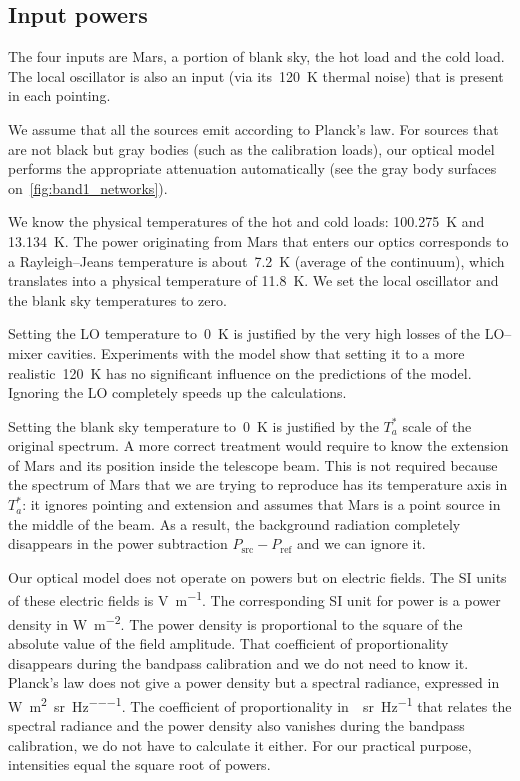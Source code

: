 \begin{refsection}

\subsection{Input powers}
The four inputs are Mars, a portion of blank sky, the hot load and the cold load.
The local oscillator is also an input (via its~\SI{120}{\kelvin} thermal noise) that is present in each pointing.

We assume that all the sources emit according to Planck's law.
For sources that are not black but gray bodies (such as the calibration loads), our optical model performs the appropriate attenuation automatically (see the gray body surfaces on~\cref{fig:band1_networks}).

We know the physical temperatures of the hot and cold loads:
\SI{100.275}{\kelvin} and \SI{13.134}{\kelvin}.
The power originating from Mars that enters our optics corresponds to a Rayleigh--Jeans temperature is about~\SI{7.2}{\kelvin} (average of the continuum), which translates into a physical temperature of \SI{11.8}{\kelvin}.
We set the local oscillator and the blank sky temperatures to zero.

Setting the LO temperature to~\SI{0}{\kelvin} is justified by the very high losses of the LO--mixer cavities.
Experiments with the model show that setting it to a more realistic~\SI{120}{\kelvin} has no significant influence on the predictions of the model.
Ignoring the LO completely speeds up the calculations.

Setting the blank sky temperature to~\SI{0}{\kelvin} is justified by the $T_a^*$ scale of the original spectrum.
A more correct treatment would require to know the extension of Mars and its position inside the telescope beam.
This is not required because the spectrum of Mars that we are trying to reproduce has its temperature axis in $T_a^*$: it ignores pointing and extension and assumes that Mars is a point source in the middle of the beam.
As a result, the background radiation completely disappears in the power subtraction $P_\text{src}-P_\text{ref}$ and we can ignore it.

Our optical model does not operate on powers but on electric fields.
The SI units of these electric fields is \si{\volt\per\meter}.
The corresponding SI unit for power is a power density in \si{\watt\per\meter\squared}.
The power density is proportional to the square of the absolute value of the field amplitude.
That coefficient of proportionality disappears during the bandpass calibration and we do not need to know it.
Planck's law does not give a power density but a spectral radiance, expressed in
\si{\watt\per\meter\squared\per\steradian\per\hertz}.
The coefficient of proportionality in~\si{\per\steradian\per\hertz} that relates the spectral radiance and the power density also vanishes during the bandpass calibration, we do not have to calculate it either.
For our practical purpose, intensities equal the square root of powers.


\end{refsection}
